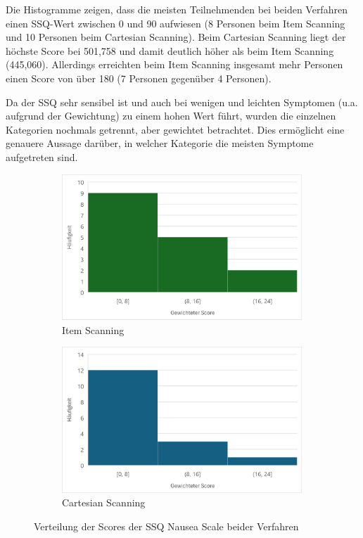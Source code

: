 Die Histogramme zeigen, dass die meisten Teilnehmenden bei beiden Verfahren einen SSQ-Wert zwischen 0 und 90 aufwiesen (8 Personen beim Item Scanning und 10 Personen beim Cartesian Scanning). Beim Cartesian Scanning liegt der höchste Score bei 501,758 und damit deutlich höher als beim Item Scanning (445,060). Allerdings erreichten beim Item Scanning insgesamt mehr Personen einen Score von über 180 (7 Personen gegenüber 4 Personen).

Da der SSQ sehr sensibel ist und auch bei wenigen und leichten Symptomen (u.a. aufgrund der Gewichtung) zu einem hohen Wert führt, wurden die einzelnen Kategorien nochmals getrennt, aber gewichtet betrachtet. Dies ermöglicht eine genauere Aussage darüber, in welcher Kategorie die meisten Symptome aufgetreten sind. 

\begin{figure}
    \centering
    \begin{subfigure}{.5\textwidth}
        \centering
        \includegraphics[width=0.99\textwidth]{images/Results/Histogramm-Nausea-Scale-Item.png}
        \caption{Item Scanning}
        \label{fig:histoNauseaItem}   
    \end{subfigure}%
    \begin{subfigure}{.5\textwidth}
        \centering
        \includegraphics[width=0.99\textwidth]{images/Results/Histogramm-Nausea-Scale-Cartesian.png}
         \caption{Cartesian Scanning}
         \label{fig:histoNauseaCartesian}
    \end{subfigure}
    \caption{Verteilung der Scores der SSQ Nausea Scale beider Verfahren}
    \label{fig:histoNausea}
\end{figure}

